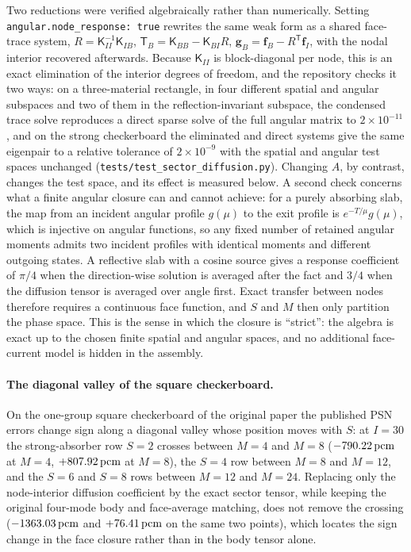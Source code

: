 \begin{sloppypar}
Two reductions were verified algebraically rather than numerically. Setting
\texttt{angular.node\_response: true} rewrites the same weak form as a shared
face-trace system, $R=\mathsf{K}_{II}^{-1}\mathsf{K}_{IB}$,
$\mathsf{T}_B=\mathsf{K}_{BB}-\mathsf{K}_{BI}R$,
$\mathbf{g}_B=\mathbf{f}_B-R^{\mathsf T}\mathbf{f}_I$, with the nodal interior
recovered afterwards. Because $\mathsf{K}_{II}$ is block-diagonal per node,
this is an exact elimination of the interior degrees of freedom, and the
repository checks it two ways: on a three-material rectangle, in four different
spatial and angular subspaces and two of them in the reflection-invariant
subspace, the condensed trace solve reproduces a direct sparse solve of the full
angular matrix to $2\times10^{-11}$, and on the strong checkerboard the eliminated and direct
systems give the same eigenpair to a relative tolerance of $2\times10^{-9}$
with the spatial and angular test spaces unchanged
(\texttt{tests/test\_sector\_diffusion.py}). Changing $A$, by contrast, changes the test space, and its effect
is measured below. A second check concerns what a finite angular closure can
and cannot achieve: for a purely absorbing slab, the map from an incident
angular profile $g(\mu)$ to the exit profile is $e^{-T/\mu}g(\mu)$, which is
injective on angular functions, so any fixed number of retained angular
moments admits two incident profiles with identical moments and different
outgoing states. A reflective slab with a cosine source gives a response
coefficient of $\pi/4$ when the direction-wise solution is averaged after the
fact and $3/4$ when the diffusion tensor is averaged over angle first. Exact
transfer between nodes therefore requires a continuous face function, and
$S$ and $M$ then only partition the phase space. This is the sense in which
the closure is ``strict'': the algebra is exact up to the chosen finite
spatial and angular spaces, and no additional face-current model is hidden in
the assembly.

\end{sloppypar}

\paragraph{The diagonal valley of the square checkerboard.}
On the one-group square checkerboard of the original paper the published PSN
errors change sign along a diagonal valley whose position moves with $S$: at
$I{=}30$ the strong-absorber row $S{=}2$ crosses between $M{=}4$ and $M{=}8$
($-790.22\,\mathrm{pcm}$ at $M{=}4$, $+807.92\,\mathrm{pcm}$ at $M{=}8$), the $S{=}4$ row between
$M{=}8$ and $M{=}12$, and the $S{=}6$ and $S{=}8$ rows between $M{=}12$ and
$M{=}24$. Replacing only the node-interior diffusion coefficient by the exact
sector tensor, while keeping the original four-mode body and face-average
matching, does not remove the crossing ($-1363.03\,\mathrm{pcm}$ and $+76.41\,\mathrm{pcm}$ on
the same two points), which locates the sign change in the face closure rather
than in the body tensor alone.

